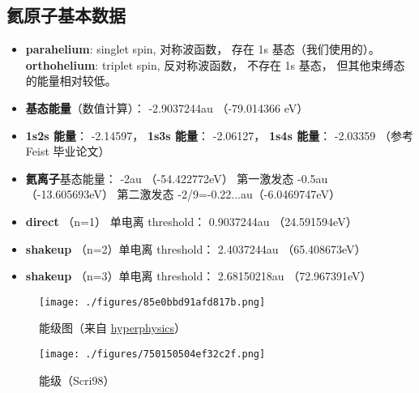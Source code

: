 

\subsection{氦原子基本数据}

\begin{itemize}
\item \textbf{parahelium}: singlet spin, 对称波函数， 存在 1s 基态（我们使用的）。 \textbf{orthohelium}: triplet spin, 反对称波函数， 不存在 1s 基态， 但其他束缚态的能量相对较低。

\item \textbf{基态能量}（数值计算）： -2.9037244au （-79.014366 eV）

\item \textbf{1s2s 能量}： -2.14597， \textbf{1s3s 能量}： -2.06127， \textbf{1s4s 能量}： -2.03359 （参考 Feist 毕业论文）
\item \textbf{氦离子}基态能量： -2au （-54.422772eV） 第一激发态 -0.5au （-13.605693eV） 第二激发态 -2/9=-0.22...au（-6.0469747eV）

\item \textbf{direct} （n=1） 单电离 threshold： 0.9037244au （24.591594eV）

\item \textbf{shakeup} （n=2）单电离 threshold： 2.4037244au （65.408673eV）

\item \textbf{shakeup} （n=3）单电离 threshold： 2.68150218au （72.967391eV）
\end{itemize}

\begin{figure}[ht]
\centering
\texttt{[image: ./figures/85e0bbd91afd817b.png]}
\caption{能级图（来自 \href{http://hyperphysics.phy-astr.gsu.edu/hbase/quantum/helium.html}{hyperphysics}）} \label{fig_HeAnal_3}
\end{figure}

\begin{figure}[ht]
\centering
\texttt{[image: ./figures/750150504ef32c2f.png]}
\caption{能级（Scri98）} \label{fig_HeAnal_4}
\end{figure}

